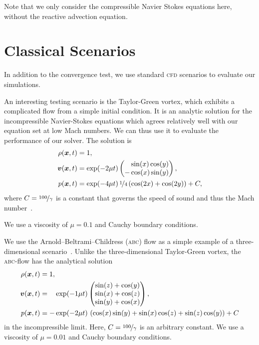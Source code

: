 Note that we only consider the compressible Navier Stokes equations here, without the reactive advection equation.

\section{Classical Scenarios}
In addition to the convergence test, we use standard \textsc{cfd} scenarios to evaluate our simulations.

An interesting testing scenario is the Taylor-Green vortex, which exhibits a complicated flow from a simple initial condition.
It is an analytic solution for the incompressible Navier-Stokes equations which agrees relatively well with our equation set at low Mach numbers.
We can thus use it to evaluate the performance of our solver.
The solution is
\begin{align}
  \label{eq:taylor-green}
  \begin{split}
  \rho(\bm{x}, t) &= 1,\\
  \bm{v}(\bm{x}, t) &= \exp(-2 \mu t)
  \begin{pmatrix}
    \phantom{-}\sin(x) \cos(y) \\
- \cos(x) \sin(y) 
    \end{pmatrix}, \\
  p(\bm{x}, t) &= \exp(-4 \mu t) \, \nicefrac{1}{4} \left( \cos(2x) + \cos(2y) \right) + C,
  \end{split}
\end{align}
where $C = \nicefrac{100}{\gamma}$ is a constant that governs the speed of sound and thus the Mach number~\cite{dumbser2016high}.

We use a viscosity of $\mu = 0.1$ and Cauchy boundary conditions.

We use the Arnold–Beltrami–Childress (\textsc{abc}) flow as a simple example of a three-dimensional scenario~\cite{tavelli2016staggered}.
Unlike the three-dimensional Taylor-Green vortex, the \textsc{abc}-flow has the analytical solution
\begin{align}
  \label{eq:abc-flow}
  \begin{split}
  \rho(\bm{x}, t) &= 1,\\
  \bm{v}(\bm{x}, t) &= \phantom{-} \exp(-1\mu t)
  \begin{pmatrix}
    \sin(z) + \cos(y)\\
    \sin(x) + \cos(z)\\
    \sin(y) + \cos(x)
  \end{pmatrix}, \\
  p(\bm{x}, t) &= -\exp(-2 \mu t) \, \left(\cos(x)\sin(y) + \sin(x)\cos(z) + \sin(z)\cos(y)\right)
  + C
  \end{split}
\end{align}
in the incompressible limit.
Here, $C = \nicefrac{100}{\gamma}$ is an arbitrary constant.
We use a viscosity of $\mu = 0.01$ and Cauchy boundary conditions.

